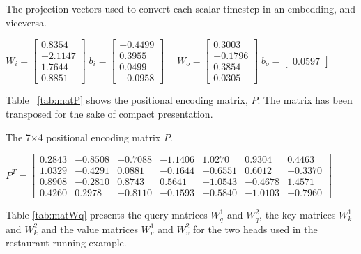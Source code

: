 \documentclass[algorithms,article,submit,pdftex,moreauthors]{Definitions/mdpi}
\begin{document}
\begin{table}[ht]
	\centering
	\caption{The projection vectors used to convert each scalar timestep in an embedding, and viceversa.}
	\label{tab:seca}
	$
	W_i = 	\begin{bmatrix}
				0.8354 \\
				-2.1147 \\
				1.7644 \\
				0.8851
			\end{bmatrix} \;
	b_i = 	\begin{bmatrix}
				-0.4499 \\  0.3955 \\  0.0499 \\ -0.0958
			\end{bmatrix} \quad\;
	W_o = 	\begin{bmatrix}
				 0.3003 \\ -0.1796 \\  0.3854 \\  0.0305
			\end{bmatrix} \;
	b_o = 	\begin{bmatrix}
				0.0597
			\end{bmatrix}
	$
\end{table}

\noindent Table ~\ref{tab:matP} shows the positional encoding matrix, $P$. The matrix has been transposed for the sake of compact presentation.

\begin{table}[ht]
	\centering
	\caption{The 7$\times$4 positional encoding matrix $P$.}
	\label{tab:matP}
	$
	P^T = \begin{bmatrix}
	0.2843 & -0.8508 & -0.7088 & -1.1406 &  1.0270 &  0.9304 &  0.4463 \\
	1.0329 & -0.4291 &  0.0881 & -0.1644 & -0.6551 &  0.6012 & -0.3370 \\
	0.8908 & -0.2810 &  0.8743 &  0.5641 & -1.0543 & -0.4678 &  1.4571 \\
	0.4260 &  0.2978 & -0.8110 & -0.1593 & -0.5840 & -1.0103 & -0.7960
	\end{bmatrix}
	$
\end{table}

\noindent Table \ref{tab:matWq} presents the query matrices $W^1_q$ and $W^2_q$, the key matrices $W^1_k$ and $W^2_k$ and the value matrices $W^1_v$ and $W^2_v$ for the two heads used in the restaurant running example.
\end{document}
